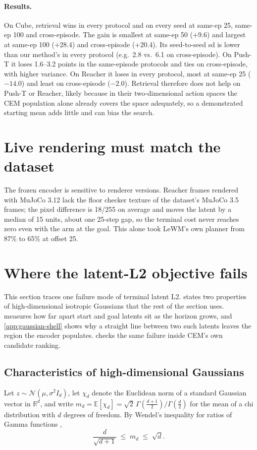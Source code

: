 \documentclass{article} %
\theoremstyle{definition}
\theoremstyle{remark}
\begin{document}
\paragraph{Results.} On Cube, retrieval wins in every protocol and on every seed at
same-ep 25, same-ep 100 and cross-episode. The gain is smallest at same-ep 50 (+9.6) and largest at
same-ep 100 (+28.4) and cross-episode (+20.4). Its seed-to-seed sd is lower than our method's in
every protocol (e.g.\ 2.8 vs.\ 6.1 on cross-episode). On Push-T it loses 1.6--3.2 points in the
same-episode protocols and ties on cross-episode, with higher variance. On Reacher it loses in
every protocol, most at same-ep 25 ($-14.0$) and least on cross-episode ($-2.0$). Retrieval therefore does not help on
Push-T or Reacher, likely because in their two-dimensional action spaces the CEM population
alone already covers the space adequately, so a demonstrated starting mean adds little and can
bias the search.


\section{Live rendering must match the dataset}
\label{app:render}
The frozen encoder is sensitive to renderer versions. Reacher frames rendered with MuJoCo 3.12
lack the floor checker texture of the dataset's MuJoCo 3.5 frames; the pixel difference is 18/255
on average and moves the latent by a median of 15 units, about one 25-step gap, so the terminal
cost never reaches zero even with the arm at the goal. This alone took LeWM's own planner from 87\%
to 65\% at offset 25. 


\section{Where the latent-L2 objective fails}
\label{app:lewm-failure}
This section traces one failure mode of terminal latent L2.  states two
properties of high-dimensional isotropic Gaussians that the rest of the section uses.
 measures how far apart start and goal latents sit as the horizon
grows, and \cref{app:gaussian-shell} shows why a straight line between two such latents leaves
the region the encoder populates.  checks the same failure inside CEM's own
candidate ranking.

\subsection{Characteristics of high-dimensional Gaussians}
\label{app:hd-gaussian}
Let $z\sim\mathcal N(\mu,\sigma^2 I_d)$, let $\chi_d$ denote the Euclidean norm of a standard
Gaussian vector in $\mathbb R^d$, and write $m_d=\mathbb E[\chi_d]=\sqrt2\,
\Gamma(\tfrac{d+1}{2})/\Gamma(\tfrac d2)$ for the mean of a chi distribution with $d$ degrees of
freedom. By Wendel's inequality for ratios of Gamma functions \citep{wendel1948note},
\begin{equation}
  \frac{d}{\sqrt{d+1}}\;\le\; m_d\;\le\;\sqrt d .
  \label{eq:chi-mean}
\end{equation}
\end{document}
